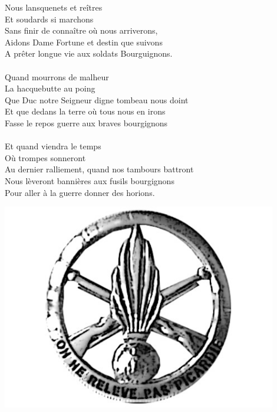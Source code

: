 \breakpage
Nous lansquenets et reîtres
\\Et soudards si marchons
\\Sans finir de connaître où nous arriverons,
\\Aidons Dame Fortune et destin que suivons
\\A prêter longue vie aux soldats Bourguignons.
\\\\Quand mourrons de malheur
\\La hacquebutte au poing
\\Que Duc notre Seigneur digne tombeau nous doint
\\Et que dedans la terre où tous nous en irons
\\Fasse le repos guerre aux braves bourgignons
\\\\Et quand viendra le temps
\\Où trompes sonneront
\\Au dernier ralliement, quand nos tambours battront
\\Nous lèveront bannières aux fusils bourgignons
\\Pour aller à la guerre donner des horions.
\\
\bigskip
\begin{center}
\includegraphics[width=0.9\textwidth]{images/picard.jpg}
\end{center}

\breakpage